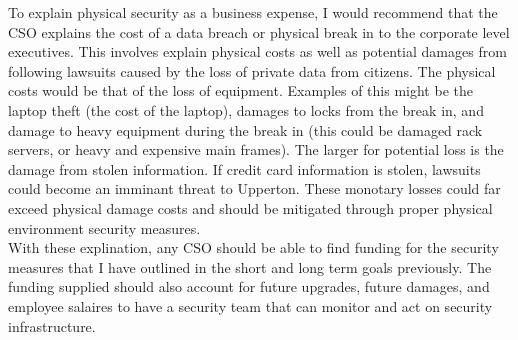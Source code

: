 \documentclass[paper=a4, fontsize=11pt]{scrartcl} %
\numberwithin{equation}{section} %
\numberwithin{figure}{section} %
\numberwithin{table}{section} %
\begin{document}
To explain physical security as a business expense, I would recommend that the CSO explains
the cost of a data breach or physical break in to the corporate level executives. This involves
explain physical costs as well as potential damages from following lawsuits caused by the
loss of private data from citizens. The physical costs would be that of the loss of equipment.
Examples of this might be the laptop theft (the cost of the laptop), damages to locks from
the break in, and damage to heavy equipment during the break in (this could be damaged rack
servers, or heavy and expensive main frames). The larger for potential loss is the damage from
stolen information. If credit card information is stolen, lawsuits could become an imminant
threat to Upperton. These monotary losses could far exceed physical damage costs and should
be mitigated through proper physical environment security measures.\\

With these explination, any CSO should be able to find funding for the security measures
that I have outlined in the short and long term goals previously. The funding supplied
should also account for future upgrades, future damages, and employee salaires to have
a security team that can monitor and act on security infrastructure.
\end{document}
